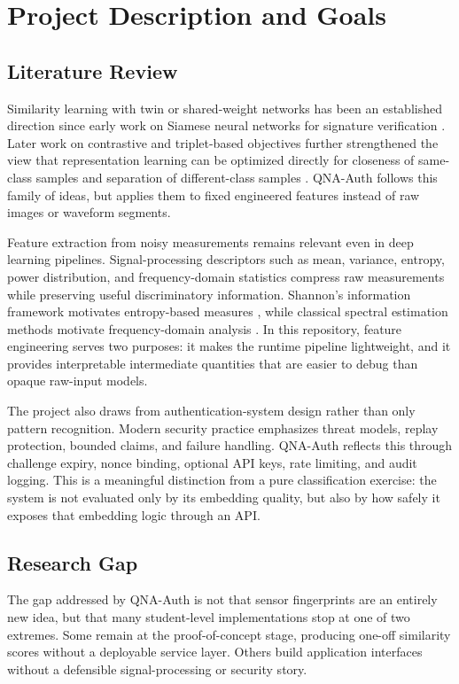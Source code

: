 \documentclass[12pt]{report}
\begin{document}
\chapter{Project Description and Goals}
\section{Literature Review}
Similarity learning with twin or shared-weight networks has been an established direction since early work on Siamese neural networks for signature verification \cite{bromley1993signature}. Later work on contrastive and triplet-based objectives further strengthened the view that representation learning can be optimized directly for closeness of same-class samples and separation of different-class samples \cite{hadsell2006dimensionality, schroff2015facenet}. QNA-Auth follows this family of ideas, but applies them to fixed engineered features instead of raw images or waveform segments.

Feature extraction from noisy measurements remains relevant even in deep learning pipelines. Signal-processing descriptors such as mean, variance, entropy, power distribution, and frequency-domain statistics compress raw measurements while preserving useful discriminatory information. Shannon's information framework motivates entropy-based measures \cite{shannon1948mathematical}, while classical spectral estimation methods motivate frequency-domain analysis \cite{welch1967use}. In this repository, feature engineering serves two purposes: it makes the runtime pipeline lightweight, and it provides interpretable intermediate quantities that are easier to debug than opaque raw-input models.

The project also draws from authentication-system design rather than only pattern recognition. Modern security practice emphasizes threat models, replay protection, bounded claims, and failure handling. QNA-Auth reflects this through challenge expiry, nonce binding, optional API keys, rate limiting, and audit logging. This is a meaningful distinction from a pure classification exercise: the system is not evaluated only by its embedding quality, but also by how safely it exposes that embedding logic through an API.

\section{Research Gap}
The gap addressed by QNA-Auth is not that sensor fingerprints are an entirely new idea, but that many student-level implementations stop at one of two extremes. Some remain at the proof-of-concept stage, producing one-off similarity scores without a deployable service layer. Others build application interfaces without a defensible signal-processing or security story.
\end{document}
